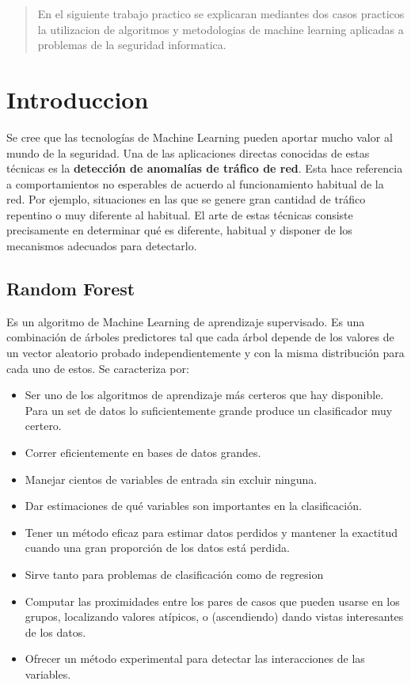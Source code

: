\documentclass[a4paper,10pt]{article}
\begin{document}
\thispagestyle{empty}


\newpage

\tableofcontents

\newpage


\begin{abstract}
	En el siguiente trabajo practico se explicaran mediantes dos casos practicos la utilizacion de algoritmos y metodologias de machine learning aplicadas a problemas de la seguridad informatica.
\end{abstract}  

\newpage

\section{Introduccion}

Se cree que las tecnologías de Machine Learning pueden aportar mucho valor al mundo de la seguridad. Una de las aplicaciones directas conocidas de estas técnicas es la \textbf{detección de anomalías de tráfico de red}. Esta hace referencia a comportamientos no esperables de acuerdo al funcionamiento habitual de la red. Por ejemplo, situaciones en las que se genere gran cantidad de tráfico repentino o muy diferente al habitual. El arte de estas técnicas consiste precisamente en determinar qué es diferente, habitual y disponer de los mecanismos adecuados para detectarlo. 

\subsection{Random Forest}
Es un algoritmo de Machine Learning de aprendizaje supervisado. Es una combinación de árboles predictores tal que cada árbol depende de los valores de un vector aleatorio probado independientemente y con la misma distribución para cada uno de estos. Se caracteriza por:
\begin{itemize}
\item Ser uno de los algoritmos de aprendizaje más certeros que hay disponible. Para un set de datos lo suficientemente grande produce un clasificador muy certero. 
\item Correr eficientemente en bases de datos grandes.
\item Manejar cientos de variables de entrada sin excluir ninguna.
\item Dar estimaciones de qué variables son importantes en la clasificación.
\item Tener un método eficaz para estimar datos perdidos y mantener la exactitud cuando una gran proporción de los datos está perdida.
\item Sirve tanto para problemas de clasificación como de regresion
\item Computar las proximidades entre los pares de casos que pueden usarse en los grupos, localizando valores atípicos, o (ascendiendo) dando vistas interesantes de los datos.
\item Ofrecer un método experimental para detectar las interacciones de las variables.
\end{itemize}
\end{document}
